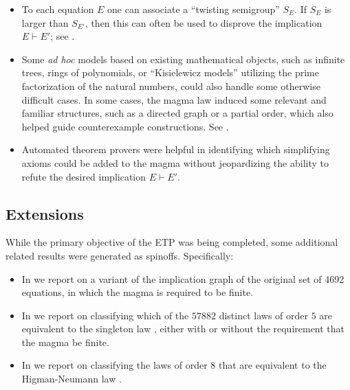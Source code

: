 \begin{itemize}
        \item To each equation $E$ one can associate a ``twisting semigroup'' $S_E$.  If $S_E$ is larger than $S_{E'}$, then this can often be used to disprove the implication $E \vdash E'$; see .
        \item Some \emph{ad hoc} models based on existing mathematical objects, such as infinite trees, rings of polynomials, or ``Kisielewicz models'' utilizing the prime factorization of the natural numbers, could also handle some otherwise difficult cases.  In some cases, the magma law induced some relevant and familiar structures, such as a directed graph or a partial order, which also helped guide counterexample constructions. See .
        \item Automated theorem provers were helpful in identifying which simplifying axioms could be added to the magma without jeopardizing the ability to refute the desired implication $E \vdash E'$.
\end{itemize}

\subsection{Extensions}

While the primary objective of the ETP was being completed, some additional related results were generated as spinoffs.  Specifically:
\begin{itemize}
\item In  we report on a variant of the implication graph of the original set of 4692 equations, in which the magma is required to be finite.
\item In  we report on classifying which of the $57882$ distinct laws of order $5$ are equivalent to the singleton law , either with or without the requirement that the magma be finite.
\item In  we report on classifying the laws of order $8$ that are equivalent to the Higman-Neumann law .
\end{itemize}

